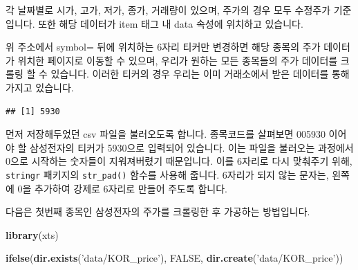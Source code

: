 \documentclass[]{book}
\newenvironment{Shaded}{\begin{snugshade}}{\end{snugshade}}
\newcommand{\DataTypeTok}[1]{\textcolor[rgb]{0.13,0.29,0.53}{#1}}
\newcommand{\DecValTok}[1]{\textcolor[rgb]{0.00,0.00,0.81}{#1}}
\newcommand{\KeywordTok}[1]{\textcolor[rgb]{0.13,0.29,0.53}{\textbf{#1}}}
\newcommand{\NormalTok}[1]{#1}
\newcommand{\OperatorTok}[1]{\textcolor[rgb]{0.81,0.36,0.00}{\textbf{#1}}}
\newcommand{\OtherTok}[1]{\textcolor[rgb]{0.56,0.35,0.01}{#1}}
\newcommand{\StringTok}[1]{\textcolor[rgb]{0.31,0.60,0.02}{#1}}
\begin{document}
각 날짜별로 시가, 고가, 저가, 종가, 거래량이 있으며, 주가의 경우 모두 수정주가 기준입니다. 또한 해당 데이터가 item 태그 내 data 속성에 위치하고 있습니다.

위 주소에서 symbol= 뒤에 위치하는 6자리 티커만 변경하면 해당 종목의 주가 데이터가 위치한 페이지로 이동할 수 있으며, 우리가 원하는 모든 종목들의 주가 데이터를 크롤링 할 수 있습니다. 이러한 티커의 경우 우리는 이미 거래소에서 받은 데이터를 통해 가지고 있습니다.

\begin{Shaded}
\end{Shaded}

\begin{verbatim}
## [1] 5930
\end{verbatim}

\begin{Shaded}
\end{Shaded}

먼저 저장해두었던 csv 파일을 불러오도록 합니다. 종목코드를 살펴보면 005930 이어야 할 삼성전자의 티커가 5930으로 입력되어 있습니다. 이는 파일을 불러오는 과정에서 0으로 시작하는 숫자들이 지워져버렸기 때문입니다. 이를 6자리로 다시 맞춰주기 위해, \texttt{stringr} 패키지의 \texttt{str\_pad()} 함수를 사용해 줍니다. 6자리가 되지 않는 문자는, 왼쪽에 0을 추가하여 강제로 6자리로 만들어 주도록 합니다.

다음은 첫번째 종목인 삼성전자의 주가를 크롤링한 후 가공하는 방법입니다.

\begin{Shaded}
\begin{Highlighting}[]
\KeywordTok{library}\NormalTok{(xts)}

\KeywordTok{ifelse}\NormalTok{(}\KeywordTok{dir.exists}\NormalTok{(}\StringTok{'data/KOR_price'}\NormalTok{), }\OtherTok{FALSE}\NormalTok{, }\KeywordTok{dir.create}\NormalTok{(}\StringTok{'data/KOR_price'}\NormalTok{))}
\end{Highlighting}
\end{Shaded}
\end{document}
